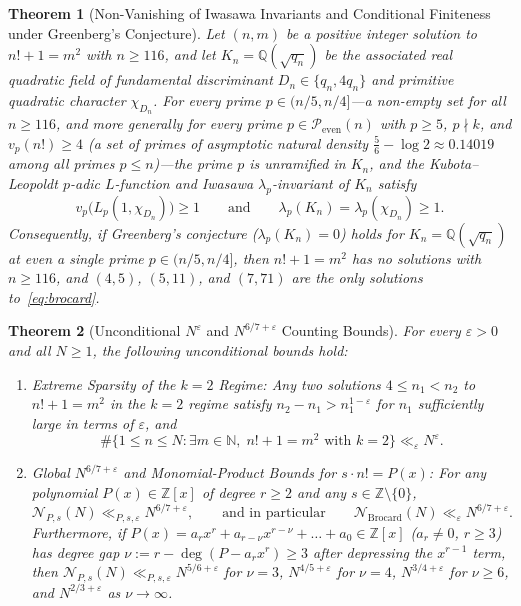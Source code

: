 \documentclass[11pt,reqno]{amsart}
\newtheorem{theorem}{Theorem}[section]
\theoremstyle{remark}
\newcommand{\N}{\mathbb{N}}
\newcommand{\Z}{\mathbb{Z}}
\newcommand{\Q}{\mathbb{Q}}
\newcommand{\Peven}{\mathcal{P}_{\mathrm{even}}}
\begin{document}
\begin{theorem}[Non-Vanishing of Iwasawa Invariants and Conditional Finiteness under Greenberg's Conjecture]\label{thm:1.2}
Let $(n, m)$ be a positive integer solution to $n! + 1 = m^2$ with $n \ge 116$, and let $K_n = \Q(\sqrt{q_n})$ be the associated real quadratic field of fundamental discriminant $D_n \in \{q_n, 4q_n\}$ and primitive quadratic character $\chi_{D_n}$. For every prime $p \in (n/5, n/4]$---a non-empty set for all $n \ge 116$, and more generally for every prime $p \in \Peven(n)$ with $p \ge 5$, $p \nmid k$, and $v_p(n!) \ge 4$ (a set of primes of asymptotic natural density $\frac{5}{6} - \log 2 \approx 0.14019$ among all primes $p \le n$)---the prime $p$ is unramified in $K_n$, and the Kubota--Leopoldt $p$-adic $L$-function and Iwasawa $\lambda_p$-invariant of $K_n$ satisfy
\begin{equation}\label{eq:iwasawa}
v_p\bigl(L_p(1, \chi_{D_n})\bigr) \ge 1 \qquad \text{and} \qquad \lambda_p(K_n) = \lambda_p(\chi_{D_n}) \ge 1.
\end{equation}
Consequently, if Greenberg's conjecture ($\lambda_p(K_n) = 0$) holds for $K_n = \Q(\sqrt{q_n})$ at even a single prime $p \in (n/5, n/4]$, then $n! + 1 = m^2$ has no solutions with $n \ge 116$, and $(4, 5)$, $(5, 11)$, and $(7, 71)$ are the only solutions to~\eqref{eq:brocard}.
\end{theorem}

\begin{theorem}[Unconditional $N^\varepsilon$ and $N^{6/7+\varepsilon}$ Counting Bounds]\label{thm:1.3}
For every $\varepsilon > 0$ and all $N \ge 1$, the following unconditional bounds hold:
\begin{enumerate}
\item[(i)] \emph{Extreme Sparsity of the $k = 2$ Regime:} Any two solutions $4 \le n_1 < n_2$ to $n! + 1 = m^2$ in the $k = 2$ regime satisfy $n_2 - n_1 > n_1^{1-\varepsilon}$ for $n_1$ sufficiently large in terms of $\varepsilon$, and
\begin{equation}\label{eq:k2-sparsity}
\#\{1 \le n \le N : \exists m \in \N,\; n! + 1 = m^2 \text{ with } k = 2\} \ll_\varepsilon N^\varepsilon.
\end{equation}
\item[(ii)] \emph{Global $N^{6/7+\varepsilon}$ and Monomial-Product Bounds for $s \cdot n! = P(x)$:} For any polynomial $P(x) \in \Z[x]$ of degree $r \ge 2$ and any $s \in \Z \setminus \{0\}$,
\begin{equation}\label{eq:global-67}
\mathcal{N}_{P,s}(N) \ll_{P,s,\varepsilon} N^{6/7+\varepsilon}, \qquad \text{and in particular} \qquad \mathcal{N}_{\mathrm{Brocard}}(N) \ll_\varepsilon N^{6/7+\varepsilon}.
\end{equation}
Furthermore, if $P(x) = a_r x^r + a_{r-\nu} x^{r-\nu} + \dots + a_0 \in \Z[x]$ ($a_r \ne 0$, $r \ge 3$) has degree gap $\nu := r - \deg(P - a_r x^r) \ge 3$ after depressing the $x^{r-1}$ term, then $\mathcal{N}_{P,s}(N) \ll_{P,s,\varepsilon} N^{5/6+\varepsilon}$ for $\nu = 3$, $N^{4/5+\varepsilon}$ for $\nu = 4$, $N^{3/4+\varepsilon}$ for $\nu \ge 6$, and $N^{2/3+\varepsilon}$ as $\nu \to \infty$.
\end{enumerate}
\end{theorem}
\end{document}
